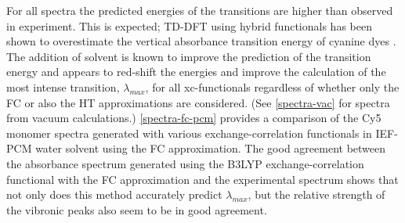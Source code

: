 For all spectra the predicted energies of the transitions are higher than observed in experiment. This is expected; TD-DFT using hybrid functionals has been shown to overestimate the vertical absorbance transition energy of cyanine dyes \cite{Laurent2014, Champagne2006, LeGuennic2015}. The addition of solvent is known to improve the prediction of the transition energy \cite{Champagne2006} and appears to red-shift the energies and improve the calculation of the most intense transition, $\lambda_{max}$, for all xc-functionals regardless of whether only the FC or also the HT approximations are considered. (See \autoref{spectra-vac} for spectra from vacuum calculations.) \autoref{spectra-fc-pcm} provides a comparison of the Cy5 monomer spectra generated with various exchange-correlation functionals in IEF-PCM water solvent using the FC approximation. The good agreement between the absorbance spectrum generated using the B3LYP exchange-correlation functional with the FC approximation and the experimental spectrum shows that not only does this method accurately predict $\lambda_{max}$, but the relative strength of the vibronic peaks also seem to be in good agreement. 

